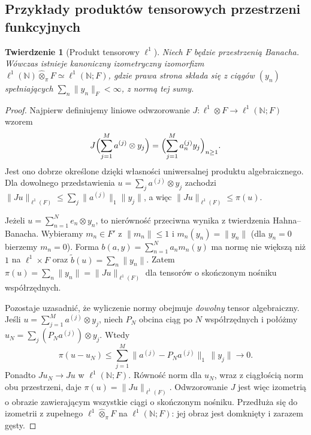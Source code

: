 \documentclass[11pt,a4paper]{article}
\numberwithin{equation}{section}
\theoremstyle{plain}
\newtheorem{twierdzenie}{Twierdzenie}[section]
\theoremstyle{definition}
\theoremstyle{remark}
\newcommand{\N}{\mathbb N}
\begin{document}
\subsection{Przykłady produktów tensorowych przestrzeni funkcyjnych}

\begin{twierdzenie}[Produkt tensorowy $\ell^1$]
\label{thm:l1-tensor24}
Niech $F$ będzie przestrzenią Banacha. Wówczas istnieje
kanoniczny izometryczny izomorfizm
$\ell^1(\N)\widehat\otimes_\pi F\simeq\ell^1(\N;F)$,
gdzie prawa strona składa się z ciągów $(y_n)$ spełniających
$\sum_n\|y_n\|_F<\infty$, z normą tej sumy.
\end{twierdzenie}
\begin{proof}
Najpierw definiujemy liniowe odwzorowanie
$J:\ell^1\otimes F\to\ell^1(\N;F)$ wzorem
\[
 J\Bigl(\sum_{j=1}^M a^{(j)}\otimes y_j\Bigr)
 =\Bigl(\sum_{j=1}^M a_n^{(j)}y_j\Bigr)_{n\ge1}.
\]
Jest ono dobrze określone dzięki własności uniwersalnej
produktu algebraicznego. Dla dowolnego przedstawienia
$u=\sum_j a^{(j)}\otimes y_j$ zachodzi
$\|Ju\|_{\ell^1(F)}\le\sum_j\|a^{(j)}\|_1\|y_j\|$,
a więc $\|Ju\|_{\ell^1(F)}\le\pi(u)$.

Jeżeli $u=\sum_{n=1}^N e_n\otimes y_n$, to nierówność
przeciwna wynika z twierdzenia Hahna--Banacha.
Wybieramy $m_n\in F'$ z $\|m_n\|\le1$ i
$m_n(y_n)=\|y_n\|$ (dla $y_n=0$ bierzemy $m_n=0$).
Forma $b(a,y)=\sum_{n=1}^Na_nm_n(y)$ ma normę
nie większą niż $1$ na $\ell^1\times F$ oraz
$\widetilde b(u)=\sum_n\|y_n\|$. Zatem
$\pi(u)=\sum_n\|y_n\|=\|Ju\|_{\ell^1(F)}$
dla tensorów o skończonym nośniku współrzędnych.

Pozostaje uzasadnić, że wyliczenie normy obejmuje
\emph{dowolny} tensor algebraiczny. Jeśli
$u=\sum_{j=1}^M a^{(j)}\otimes y_j$, niech $P_N$
obcina ciąg po $N$ współrzędnych i połóżmy
$u_N=\sum_j(P_Na^{(j)})\otimes y_j$. Wtedy
\[
 \pi(u-u_N)\le\sum_{j=1}^M
 \|a^{(j)}-P_Na^{(j)}\|_1\,\|y_j\|\longrightarrow0.
\]
Ponadto $Ju_N\to Ju$ w $\ell^1(\N;F)$. Równość
norm dla $u_N$, wraz z ciągłością norm obu przestrzeni,
daje $\pi(u)=\|Ju\|_{\ell^1(F)}$.
Odwzorowanie $J$ jest więc izometrią o obrazie
zawierającym wszystkie ciągi o skończonym nośniku.
Przedłuża się do izometrii z zupełnego
$\ell^1\widehat\otimes_\pi F$ na $\ell^1(\N;F)$:
jej obraz jest domknięty i zarazem gęsty.
\end{proof}
\end{document}
